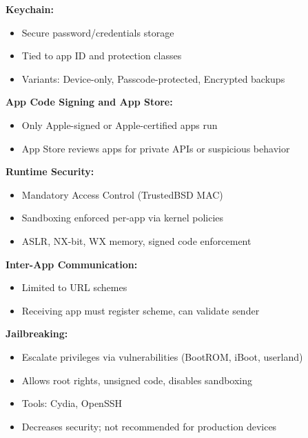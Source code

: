 {\textbf{Keychain:}
\begin{itemize}[noitemsep]
  \item Secure password/credentials storage
  \item Tied to app ID and protection classes
  \item Variants: Device-only, Passcode-protected, Encrypted backups
\end{itemize}

\textbf{App Code Signing and App Store:}
\begin{itemize}[noitemsep]
  \item Only Apple-signed or Apple-certified apps run
  \item App Store reviews apps for private APIs or suspicious behavior
\end{itemize}

\textbf{Runtime Security:}
\begin{itemize}[noitemsep]
  \item Mandatory Access Control (TrustedBSD MAC)
  \item Sandboxing enforced per-app via kernel policies
  \item ASLR, NX-bit, WX memory, signed code enforcement
\end{itemize}

\textbf{Inter-App Communication:}
\begin{itemize}[noitemsep]
  \item Limited to URL schemes
  \item Receiving app must register scheme, can validate sender
\end{itemize}

\textbf{Jailbreaking:}
\begin{itemize}[noitemsep]
  \item Escalate privileges via vulnerabilities (BootROM, iBoot, userland)
  \item Allows root rights, unsigned code, disables sandboxing
  \item Tools: Cydia, OpenSSH
  \item Decreases security; not recommended for production devices
\end{itemize}
}


